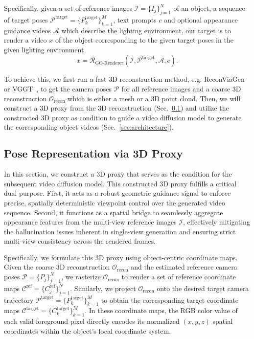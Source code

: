\documentclass[runningheads]{llncs}
\begin{document}
Specifically, given a set of reference images $\mathcal{I} = \{I_j\}_{j=1}^N$ of an object, a sequence of target poses $\mathcal{P}^\text{target} = \{P_k^\text{target}\}_{k=1}^M$, text prompts $c$ and optional appearance guidance videos $\mathcal{A}$ which describe the lighting environment, our target is to render a video $x$ of the object corresponding to the given target poses in the given lighting environment
\begin{equation}
    x=\mathcal{R}_{\text{GO-Renderer}}(\mathcal{I}, \mathcal{P}^\text{target}, \mathcal{A}, c).
\end{equation}

To achieve this, we first run a fast 3D reconstruction method, e.g. ReconViaGen~\cite{reconviagen} or VGGT~\cite{vggt}, to get the camera poses $\mathcal{P}$ for all reference images and a coarse 3D reconstruction $\mathcal{O}_{\text{recon}}$ which is either a mesh or a 3D point cloud. Then, we will construct a 3D proxy from the 3D reconstruction (Sec.~\ref{sec:pose_def}) and utilize the constructed 3D proxy as condition to guide a video diffusion model to generate the corresponding object videos (Sec.~\ref{sec:architecture}). 

\subsection{Pose Representation via 3D Proxy}
\label{sec:pose_def}

In this section, we construct a 3D proxy that serves as the condition for the subsequent video diffusion model. This constructed 3D proxy fulfills a critical dual purpose. First, it acts as a robust geometric guidance signal to enforce precise, spatially deterministic viewpoint control over the generated video sequence. Second, it functions as a spatial bridge to seamlessly aggregate appearance features from the multi-view reference images $\mathcal{I}$, effectively mitigating the hallucination issues inherent in single-view generation and ensuring strict multi-view consistency across the rendered frames.

Specifically, we formulate this 3D proxy using object-centric coordinate maps. Given the coarse 3D reconstruction $\mathcal{O}_{\text{recon}}$ and the estimated reference camera poses $\mathcal{P} = \{P_j\}_{j=1}^N$, we rasterize $\mathcal{O}_{\text{recon}}$ to render a set of reference coordinate maps $\mathcal{C}^{\text{ref}} = \{C_j^{\text{ref}}\}_{j=1}^N$. Similarly, we project $\mathcal{O}_{\text{recon}}$ onto the desired target camera trajectory $\mathcal{P}^{\text{target}} = \{P_k^{\text{target}}\}_{k=1}^M$ to obtain the corresponding target coordinate maps $\mathcal{C}^{\text{target}} = \{C_k^{\text{target}}\}_{k=1}^M$. In these coordinate maps, the RGB color value of each valid foreground pixel directly encodes its normalized $(x, y, z)$ spatial coordinates within the object's local coordinate system.
\end{document}
